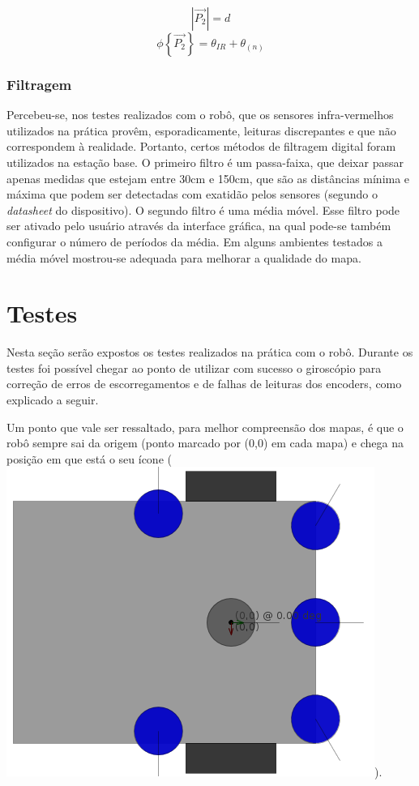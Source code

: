 \begin{equation}
  |\overrightarrow{P_2}| = d
  \label{eq:IR-P_2_modulo}
\end{equation}
\begin{equation}
  \phi \left\{ \overrightarrow{P_2} \right\} = \theta_{IR} + \theta_{(n)}
  \label{eq:IR-P_2_fase}
\end{equation}

\subsection{Filtragem}

Percebeu-se, nos testes realizados com o robô, que os sensores infra-vermelhos utilizados na prática provêm, esporadicamente, leituras discrepantes e que não correspondem à realidade. Portanto, certos métodos de filtragem digital foram utilizados na estação base. O primeiro filtro é um passa-faixa, que deixar passar apenas medidas que estejam entre 30cm e 150cm, que são as distâncias mínima e máxima que podem ser detectadas com exatidão pelos sensores (segundo o \textit{datasheet} do dispositivo). O segundo filtro é uma média móvel. Esse filtro pode ser ativado pelo usuário através da interface gráfica, na qual pode-se também configurar o número de períodos da média. Em alguns ambientes testados a média móvel mostrou-se adequada para melhorar a qualidade do mapa.


\chapter{Testes}
 
Nesta seção serão expostos os testes realizados na prática com o robô. Durante os testes foi possível chegar ao ponto de utilizar com sucesso o giroscópio para correção de erros de escorregamentos e de falhas de leituras dos encoders, como explicado a seguir. 

Um ponto que vale ser ressaltado, para melhor compreensão dos mapas, é que o robô sempre sai da origem (ponto marcado por (0,0) em cada mapa) e chega na posição em que está o seu ícone (\includegraphics[scale=0.02]{figuras/robo/robo_cor_transp_cortado.png}).



